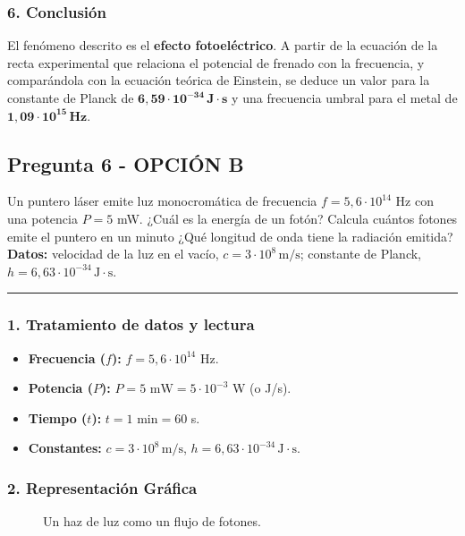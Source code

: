 \subsubsection*{6. Conclusión}
\begin{cajaconclusion}
    El fenómeno descrito es el \textbf{efecto fotoeléctrico}. A partir de la ecuación de la recta experimental que relaciona el potencial de frenado con la frecuencia, y comparándola con la ecuación teórica de Einstein, se deduce un valor para la constante de Planck de $\mathbf{6,59 \cdot 10^{-34} \, J \cdot s}$ y una frecuencia umbral para el metal de $\mathbf{1,09 \cdot 10^{15} \, Hz}$.
\end{cajaconclusion}

\newpage

\subsection{Pregunta 6 - OPCIÓN B}
\label{subsec:6B_2025_jun_res}

\begin{cajaenunciado}
Un puntero láser emite luz monocromática de frecuencia $f=5,6\cdot10^{14}$ Hz con una potencia $P=5$ mW. ¿Cuál es la energía de un fotón? Calcula cuántos fotones emite el puntero en un minuto ¿Qué longitud de onda tiene la radiación emitida?
\textbf{Datos:} velocidad de la luz en el vacío, $c=3\cdot10^{8}\,\text{m/s}$; constante de Planck, $h=6,63\cdot10^{-34}\,\text{J}\cdot\text{s}$.
\end{cajaenunciado}
\hrule

\subsubsection*{1. Tratamiento de datos y lectura}
\begin{itemize}
    \item \textbf{Frecuencia ($f$):} $f=5,6\cdot10^{14}$ Hz.
    \item \textbf{Potencia ($P$):} $P=5 \text{ mW} = 5 \cdot 10^{-3}$ W (o J/s).
    \item \textbf{Tiempo ($t$):} $t = 1 \text{ min} = 60$ s.
    \item \textbf{Constantes:} $c=3\cdot10^{8}\,\text{m/s}$, $h=6,63\cdot10^{-34}\,\text{J}\cdot\text{s}$.
\end{itemize}

\subsubsection*{2. Representación Gráfica}
\begin{figure}[H]
    \centering
    \caption{Un haz de luz como un flujo de fotones.}
\end{figure}

